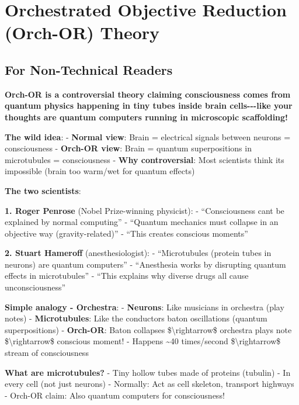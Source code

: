 \section{Orchestrated Objective Reduction (Orch-OR)
Theory}\label{orchestrated-objective-reduction-orch-or-theory}

\subsection{\texorpdfstring{ For Non-Technical
Readers}{ For Non-Technical Readers}}\label{for-non-technical-readers}

\textbf{Orch-OR is a controversial theory claiming consciousness comes
from quantum physics happening in tiny tubes inside brain
cells-\/-\/-like your thoughts are quantum computers running in
microscopic scaffolding!}

\textbf{The wild idea}: - \textbf{Normal view}: Brain = electrical
signals between neurons = consciousness - \textbf{Orch-OR view}: Brain =
quantum superpositions in microtubules = consciousness - \textbf{Why
controversial}: Most scientists think it\textquotesingle s impossible
(brain too warm/wet for quantum effects)

\textbf{The two scientists}:

\textbf{1. Roger Penrose} (Nobel Prize-winning physicist): -
``Consciousness can\textquotesingle t be explained by normal computing''
- ``Quantum mechanics must collapse in an objective way
(gravity-related)'' - ``This creates conscious moments''

\textbf{2. Stuart Hameroff} (anesthesiologist): - ``Microtubules
(protein tubes in neurons) are quantum computers'' - ``Anesthesia works
by disrupting quantum effects in microtubules'' - ``This explains why
diverse drugs all cause unconsciousness''

\textbf{Simple analogy - Orchestra}: - \textbf{Neurons}: Like musicians
in orchestra (play notes) - \textbf{Microtubules}: Like the
conductor\textquotesingle s baton oscillations (quantum superpositions)
- \textbf{Orch-OR}: Baton collapses \$\textbackslash rightarrow\$
orchestra plays note \$\textbackslash rightarrow\$ conscious moment! -
Happens \textasciitilde40 times/second \$\textbackslash rightarrow\$
stream of consciousness

\textbf{What are microtubules?} - Tiny hollow tubes made of proteins
(tubulin) - In every cell (not just neurons) - Normally: Act as cell
skeleton, transport highways - Orch-OR claim: Also quantum computers for
consciousness!

